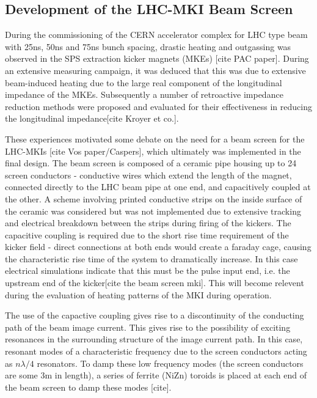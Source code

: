 \subsection{Development of the LHC-MKI Beam Screen}
\label{sec:mki-screen-development}

During the commissioning of the CERN accelerator complex for LHC type beam with 25ns, 50ns and 75ns bunch spacing, drastic heating and outgassing was observed in the SPS extraction kicker magnets (MKEs) [cite PAC paper]. During an extensive measuring campaign, it was deduced that this was due to extensive beam-induced heating due to the large real component of the longitudinal impedance of the MKEs. Subsequently a number of retroactive impedance reduction methods were proposed and evaluated for their effectiveness in reducing the longitudinal impedance[cite Kroyer et co.].

These experiences motivated some debate on the need for a beam screen for the LHC-MKIs [cite Vos paper/Caspers], which ultimately was implemented in the final design. The beam screen is composed of a ceramic pipe housing up to 24 screen conductors - conductive wires which extend the length of the magnet, connected directly to the LHC beam pipe at one end, and capacitively coupled at the other. A scheme involving printed conductive strips on the inside surface of the ceramic was considered but was not implemented due to extensive tracking and electrical breakdown between the strips during firing of the kickers. The capacitive coupling is required due to the short rise time requirement of the kicker field - direct connections at both ends would create a faraday cage, causing the characteristic rise time of the system to dramatically increase. In this case electrical simulations indicate that this must be the pulse input end, i.e. the upstream end of the kicker[cite the beam screen mki]. This will become relevent during the evaluation of heating patterns of the MKI during operation.

The use of the capactive coupling gives rise to a discontinuity of the conducting path of the beam image current. This gives rise to the possibility of exciting resonances in the surrounding structure of the image current path. In this case, resonant modes of a characteristic frequency due to the screen conductors acting as $n \lambda /4$ resonators. To damp these low frequency modes (the screen conductors are some 3m in length), a series of ferrite (NiZn) toroids is placed at each end of the beam screen to damp these modes [cite]. 

